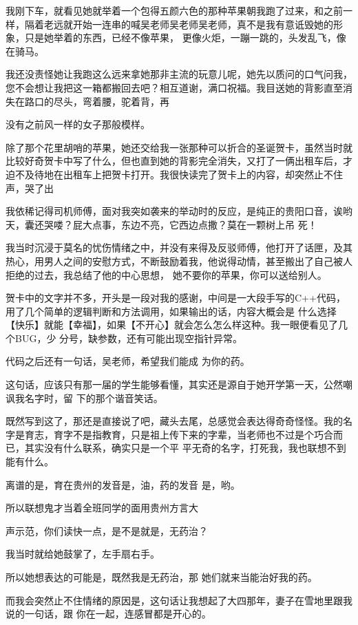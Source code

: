 \documentclass{article}
\begin{document}
我刚下车，就看见她就举着一个包得五颜六色的那种苹果朝我跑了过来，和之前一样，隔着老远就开始一连串的喊吴老师吴老师吴老师，真不是我有意诋毁她的形象，只是她举着的东西，已经不像苹果，
更像火炬，一蹦一跳的，头发乱飞，像在骑马。 

我还没责怪她让我跑这么远来拿她那非主流的玩意儿呢，她先以质问的口气问我，您不会想让我把这一箱都搬回去吧？相互道谢，满口祝福。我目送她的背影直至消失在路口的尽头，弯着腰，驼着背，再

\newpage
没有之前风一样的女子那般模样。 

除了那个花里胡哨的苹果，她还交给我一张那种可以折合的圣诞贺卡，虽然当时就比较好奇贺卡中写了什么，但也直到她的背影完全消失，又打了一俩出租车后，才迫不及待地在出租车上把贺卡打开。我很快读完了贺卡上的内容，却突然止不住声，哭了出

我依稀记得司机师傅，面对我突如袭来的举动时的反应，是纯正的贵阳口音，诶哟天，囊还哭喽？屁大点事，东边不亮，它西边点撒？莫在一颗树上吊
死！ 

我当时沉浸于莫名的忧伤情绪之中，并没有来得及反驳师傅，他打开了话匣，及其热心，用男人之间的安慰方式，不断鼓励着我，他说得动情，甚至搬出了自己被人拒绝的过去，我总结了他的中心思想，
她不要你的苹果，你可以送给别人。 

贺卡中的文字并不多，开头是一段对我的感谢，中间是一大段手写的C++代码，用了几个简单的逻辑判断和方法调用，如果输出的话，内容大概会是
\newpage
什么选择【快乐】就能【幸福】，如果【不开心】就会怎么怎么样这种。我一眼便看见了几个BUG，少
分号，缺参数，还有可能出现空指针异常。 

代码之后还有一句话，吴老师，希望我们能成
为你的药。 

这句话，应该只有那一届的学生能够看懂，其实还是源自于她开学第一天，公然嘲讽我名字时，留
下的那个谐音笑话。 

既然写到这了，那还是直接说了吧，藏头去尾，总感觉会表达得奇奇怪怪。我的名字是育志，育字不是指教育，只是祖上传下来的字辈，当老师也不过是个巧合而已，其实没有什么联系，确实只是一个平
平无奇的名字，打死我，我也联想不到能有什么。 

离谱的是，育在贵州的发音是，油，药的发音
是，哟。 

所以联想鬼才当着全班同学的面用贵州方言大
\newpage

声示范，你们读快一点，是不是就是，无药治？ 


我当时就给她鼓掌了，左手扇右手。 

所以她想表达的可能是，既然我是无药治，那
她们就来当能治好我的药。 

而我会突然止不住情绪的原因是，这句话让我想起了大四那年，妻子在雪地里跟我说的一句话，跟
你在一起，连感冒都是开心的。 
\end{document}
